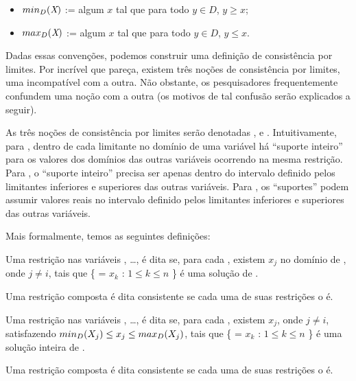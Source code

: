 \documentclass{article}
\begin{document}
\begin{itemize}
  \item $min_D(\textit{X})$ := algum $x$ tal que para todo $y \in D$, $y \geq x$;
  \item $max_D(\textit{X})$ := algum $x$ tal que para todo $y \in D$, $y  \leq x$.
\end{itemize}

Dadas essas convenções, podemos construir uma definição de consistência por limites. Por incrível
que pareça, existem três noções de consistência por limites, uma incompatível com a outra. Não
obstante, os pesquisadores frequentemente confundem uma noção com a outra (os motivos de tal
confusão serão explicados a seguir).

As três noções de consistência por limites serão denotadas \boundd, \boundz{} e \boundr.
Intuitivamente, para \boundd, dentro de cada limitante no domínio de uma variável há ``suporte
inteiro'' para os valores dos domínios das outras variáveis ocorrendo na mesma restrição.
Para \boundz, o ``suporte inteiro'' precisa ser apenas dentro do intervalo definido pelos limitantes
inferiores e superiores das outras variáveis.
Para \boundr, os ``suportes'' podem assumir valores reais no intervalo definido pelos limitantes
inferiores e superiores das outras variáveis.

Mais formalmente, temos as seguintes definições:

\begin{definition}
  Uma restrição  nas variáveis , \dots,  é dita
  se, para cada , existem  $x_j$ no domínio de , onde $j \neq i$, tais que \{ = $x_k$ : $1 \leq k \leq n$ \}
  é uma solução de .


  Uma restrição composta é dita \boundd{} consistente se cada uma de suas restrições o é.
\end{definition}

\begin{definition}
  Uma restrição  nas variáveis , \dots,  é dita
  se, para cada , existem  $x_j$, onde $j \neq i$,
  satisfazendo $min_D(\textit{$X_j$}) \leq x_j \leq max_D(\textit{$X_j$})$,
  tais que \{ = $x_k$ : $1 \leq k \leq n$ \}
  é uma solução inteira de .

  Uma restrição composta é dita \boundz{} consistente se cada uma de suas restrições o é.
\end{definition}
\end{document}
